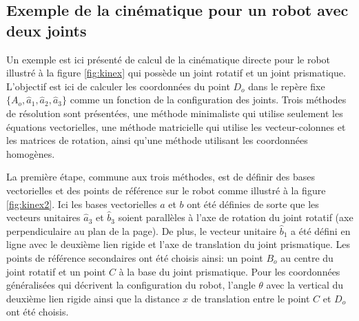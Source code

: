 

\subsection{Exemple de la cinématique pour un robot avec deux joints}

Un exemple est ici présenté de calcul de la cinématique directe pour le robot illustré à la figure \ref{fig:kinex} qui possède un joint rotatif et un joint prismatique. L'objectif est ici de calculer les coordonnées du point $D_o$ dans le repère fixe $\{ A_o, \hat{a}_1, \hat{a}_2, \hat{a}_3\}$ comme un fonction de la configuration des joints. Trois méthodes de résolution sont présentées, une méthode minimaliste qui utilise seulement les équations vectorielles, une méthode matricielle qui utilise les vecteur-colonnes et les matrices de rotation, ainsi qu'une méthode utilisant les coordonnées homogènes. 

La première étape, commune aux trois méthodes, est de définir des bases vectorielles et des points de référence sur le robot comme illustré à la figure \ref{fig:kinex2}. Ici les bases vectorielles $a$ et $b$ ont été définies de sorte que les vecteurs unitaires $\hat{a}_3$ et $\hat{b}_3$ soient parallèles à l'axe de rotation du joint rotatif (axe perpendiculaire au plan de la page). De plus, le vecteur unitaire $\hat{b}_1$ a été défini en ligne avec le deuxième lien rigide et l'axe de translation du joint prismatique. Les points de référence secondaires ont été choisis ainsi: un point $B_o$ au centre du joint rotatif et un point $C$ à la base du joint prismatique. Pour les coordonnées généralisées qui décrivent la configuration du robot, l'angle $\theta$ avec la vertical du deuxième lien rigide ainsi que la distance $x$ de translation entre le point $C$ et $D_o$ ont été choisis. 

